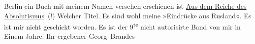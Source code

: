                   Berlin ein Buch mit meinem Namen versehen
               erschienen ist \uline{Aus dem Reiche des Absolutismus} (!) Welcher Titel. Es sind wohl meine »Eindrücke aus Rusland«. Es ist mir nicht geschickt worden. \introOben{}Es ist der 9\textsuperscript{te} nicht autorisirte Band
                  von mir in Einem Jahre.\introOben{}\pend
           \pstart Ihr ergebener \spacefill\mbox{Georg Brandes}\pend{}\endnumbering{}  
      